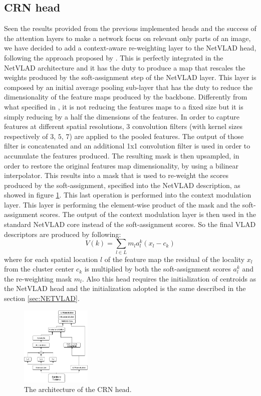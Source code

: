 \documentclass[10pt,twocolumn,letterpaper]{article}
\begin{document}
\subsection{CRN head}
Seen the results provided from the previous implemented heads and the success of the attention layers to make 
a network focus on relevant only parts of an image, we have decided to add a context-aware re-weighting layer to the NetVLAD
head, following the approach proposed by \cite{CRN}. This is perfectly integrated in the NetVLAD architecture and
it has the duty to produce a map that rescales the weights produced by the soft-assignment step of the NetVLAD layer.
This layer is composed by an initial average pooling sub-layer
that has the duty to reduce the dimensionality of the feature maps produced by the backbone. 
Differently from what specified in \cite{CRN}, it is not reducing the features maps to a fixed 
size but it is simply reducing by a half the dimensions of the features. In order to capture features at different
spatial resolutions, $3$ convolution filters (with kernel sizes respectively of $3$, $5$, $7$) are applied to the pooled features.
The  output of those filter is concatenated and an additional 1x1 convolution filter is used in order to accumulate the 
features produced. The resulting mask is then upsampled, in order to restore the original features map dimensionality,
by using a bilinear interpolator. This results into a mask that is used to re-weight the scores produced by the soft-assignment, specified
into the NetVLAD description, as showed in figure \ref{fig:CRN:ark}. This last operation is performed into the context modulation layer. This layer is 
performing the element-wise product of the mask and the soft-assignment scores. The output of the context modulation layer is then used 
in the standard NetVLAD core instead of the soft-assignment scores. So the final VLAD descriptors are produced by following:
\begin{equation}
	V(k) = \sum_{l \in L} m_l a_l^k (x_l - c_k)
\end{equation}
where for each spatial location $l$ of the feature map the residual of the locality $x_l$ from the cluster center $c_k$ 
is multiplied by both the soft-assignment scores $a_l^k$ and the re-weighting mask $m_l$. 
Also this head requires the initialization of centroids as the 
NetVLAD head and the initialization adopted is the same described in the section \ref{sec:NETVLAD}.

\begin{figure}
	\centering
	\includegraphics[width=0.3\textwidth]{img/CRN.png}
	\caption{The architecture of the CRN head.}
	\label{fig:CRN:ark}
\end{figure}
\end{document}
